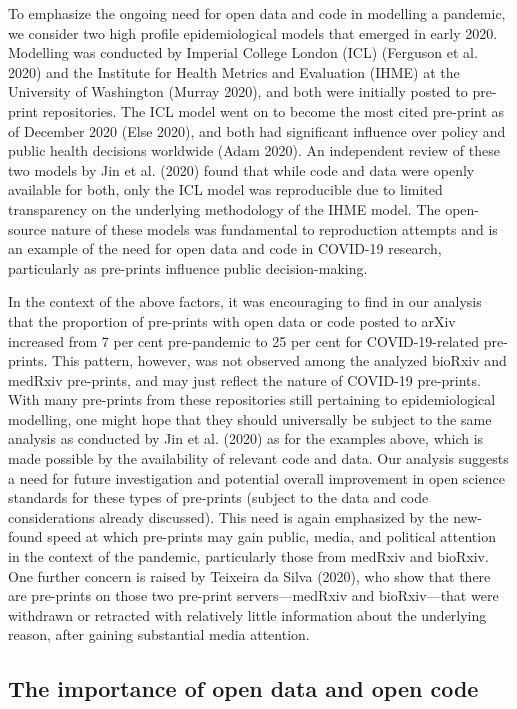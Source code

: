 \documentclass[
]{article}
\begin{document}
To emphasize the ongoing need for open data and code in modelling a pandemic, we consider two high profile epidemiological models that emerged in early 2020. Modelling was conducted by Imperial College London (ICL) (Ferguson et al. 2020) and the Institute for Health Metrics and Evaluation (IHME) at the University of Washington (Murray 2020), and both were initially posted to pre-print repositories. The ICL model went on to become the most cited pre-print as of December 2020 (Else 2020), and both had significant influence over policy and public health decisions worldwide (Adam 2020). An independent review of these two models by Jin et al. (2020) found that while code and data were openly available for both, only the ICL model was reproducible due to limited transparency on the underlying methodology of the IHME model. The open-source nature of these models was fundamental to reproduction attempts and is an example of the need for open data and code in COVID-19 research, particularly as pre-prints influence public decision-making.

In the context of the above factors, it was encouraging to find in our analysis that the proportion of pre-prints with open data or code posted to arXiv increased from 7 per cent pre-pandemic to 25 per cent for COVID-19-related pre-prints. This pattern, however, was not observed among the analyzed bioRxiv and medRxiv pre-prints, and may just reflect the nature of COVID-19 pre-prints. With many pre-prints from these repositories still pertaining to epidemiological modelling, one might hope that they should universally be subject to the same analysis as conducted by Jin et al. (2020) as for the examples above, which is made possible by the availability of relevant code and data. Our analysis suggests a need for future investigation and potential overall improvement in open science standards for these types of pre-prints (subject to the data and code considerations already discussed). This need is again emphasized by the new-found speed at which pre-prints may gain public, media, and political attention in the context of the pandemic, particularly those from medRxiv and bioRxiv. One further concern is raised by Teixeira da Silva (2020), who show that there are pre-prints on those two pre-print servers---medRxiv and bioRxiv---that were withdrawn or retracted with relatively little information about the underlying reason, after gaining substantial media attention.

\hypertarget{the-importance-of-open-data-and-open-code}{%
\subsection{The importance of open data and open code}\label{the-importance-of-open-data-and-open-code}}
\end{document}
